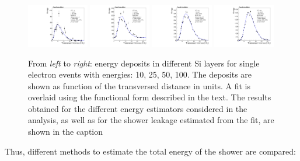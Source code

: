 \begin{figure}[h!]
  \begin{center}
    \includegraphics[width=0.24\textwidth]{figures/version_3e_5_5_showerfits}
    \includegraphics[width=0.24\textwidth]{figures/version_3e_25_8_showerfits}
    \includegraphics[width=0.24\textwidth]{figures/version_3e_75_6_showerfits}
    \includegraphics[width=0.24\textwidth]{figures/version_3e_150_6_showerfits}
    \caption{From {\em left} to {\em right}: energy deposits in different Si layers for single
      electron events with energies: 10, 25, 50, 100\GeV. The deposits
    are shown as function of the transversed distance in \Xnot
    units. A fit is overlaid using the functional form described in
    the text. 
     The results obtained for the different energy estimators
     considered in the analysis, as well as for the shower leakage
     estimated from the fit, are shown in the caption}
    \label{fig:showerfits}
  \end{center}
\end{figure}

Thus, different methods to estimate the total energy of the shower are
compared:

